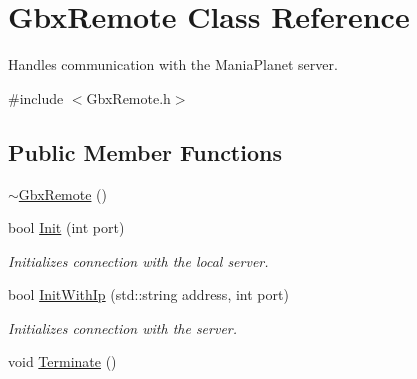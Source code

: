 \hypertarget{classGbxRemote}{\section{Gbx\-Remote Class Reference}
\label{classGbxRemote}
}


Handles communication with the Mania\-Planet server.  




{\ttfamily \#include $<$Gbx\-Remote.\-h$>$}

\subsection*{Public Member Functions}
\begin{DoxyCompactItemize}
\item 
\hyperlink{classGbxRemote_a9ac65a51eb6f9127337b4f99841cfe2d}{$\sim$\-Gbx\-Remote} ()
\item 
bool \hyperlink{classGbxRemote_a24d9d0df923ed85010f53dcb43c2b977}{Init} (int port)
\begin{DoxyCompactList}\small\item\em Initializes connection with the local server. \end{DoxyCompactList}\item 
bool \hyperlink{classGbxRemote_aa9a57e73f2f5ebbde90484503bd0d16d}{Init\-With\-Ip} (std\-::string address, int port)
\begin{DoxyCompactList}\small\item\em Initializes connection with the server. \end{DoxyCompactList}\item 
\hypertarget{classGbxRemote_a6fa8ca2d48aae84884cab98a0adf4360}{void \hyperlink{classGbxRemote_a6fa8ca2d48aae84884cab98a0adf4360}{Terminate} ()}\label{classGbxRemote_a6fa8ca2d48aae84884cab98a0adf4360}


\end{DoxyCompactItemize}
